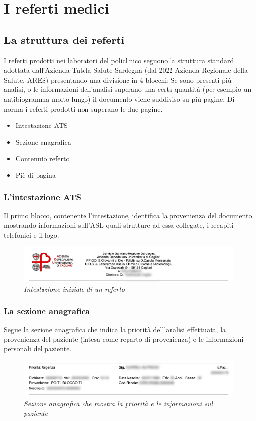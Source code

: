 \chapter{I referti medici}
\section{La struttura dei referti}
I referti prodotti nei laboratori del policlinico seguono la struttura standard adottata dall'Azienda Tutela Salute Sardegna (dal 2022 Azienda Regionale della Salute, ARES) 
presentando una divisione in 4 blocchi:
Se sono presenti più analisi, o le informazioni dell'analisi superano una certa quantità (per esempio un antibiogramma molto lungo) il documento viene suddiviso su più pagine.
Di norma i referti prodotti non superano le due pagine.

\begin{center}
	\begin{itemize}
		\item Intestazione ATS
		\item Sezione anagrafica
		\item Contenuto referto
		\item Piè di pagina
		\end{itemize}
\end{center}
\par\bigskip
\subsection{L'intestazione ATS}
Il primo blocco, contenente l'intestazione, identifica la provenienza del documento mostrando informazioni sull'ASL quali strutture ad essa collegate, i recapiti telefonici e il logo.
\begin{figure}[h!]
	\centering
	\includegraphics[width=.99\columnwidth]{images/header.png}
	\caption{\textit{Intestazione iniziale di un referto}}
	\label{fig:header}
\end{figure}
\bigskip

\subsection{La sezione anagrafica}
Segue la sezione anagrafica che indica la priorità dell'analisi effettuata, la provenienza del paziente (intesa come reparto di provenienza) e le informazioni personali del paziente.
\begin{figure}[h!]
	\centering
	\includegraphics[width=.99\columnwidth]{images/sezione_anagrafica.png}
	\caption{\textit{Sezione anagrafica che mostra la priorità e le informazioni sul paziente}}
	\label{fig:header}
\end{figure}
\bigskip
